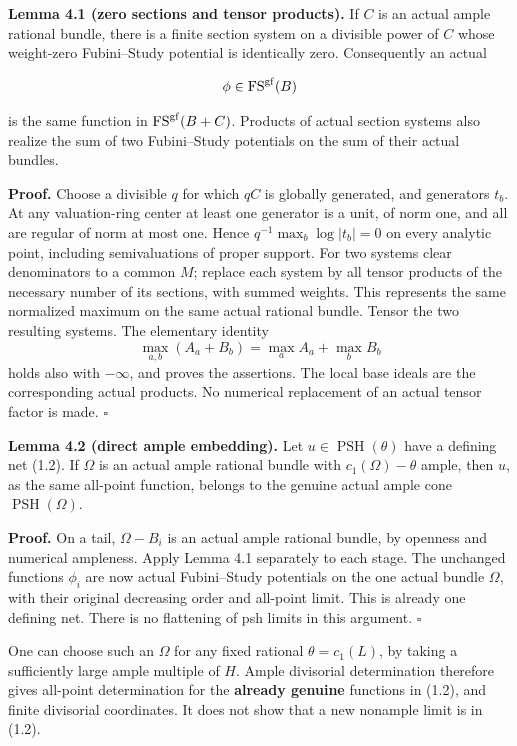 \documentclass[10pt]{article}
\begin{document}
\textbf{Lemma 4.1 (zero sections and tensor products).} If \(C\) is an
actual ample rational bundle, there is a finite section system on a
divisible power of \(C\) whose weight-zero Fubini--Study potential is
identically zero. Consequently an actual

\[
 \phi\in\operatorname{FS}^{\rm gf}(B)
\]

is the same function in \(\operatorname{FS}^{\rm gf}(B+C)\). Products of
actual section systems also realize the sum of two Fubini--Study
potentials on the sum of their actual bundles.

\textbf{Proof.} Choose a divisible \(q\) for which \(qC\) is globally
generated, and generators \(t_b\). At any valuation-ring center at least
one generator is a unit, of norm one, and all are regular of norm at
most one. Hence \(q^{-1}\max_b\log|t_b|=0\) on every analytic point,
including semivaluations of proper support. For two systems clear
denominators to a common \(M\); replace each system by all tensor
products of the necessary number of its sections, with summed weights.
This represents the same normalized maximum on the same actual rational
bundle. Tensor the two resulting systems. The elementary identity \[
 \max_{a,b}(A_a+B_b)=\max_a A_a+\max_b B_b
\] holds also with \(-\infty\), and proves the assertions. The local
base ideals are the corresponding actual products. No numerical
replacement of an actual tensor factor is made. \(\square\)

\textbf{Lemma 4.2 (direct ample embedding).} Let
\(u\in\operatorname{PSH}(\theta)\) have a defining net (1.2). If
\(\Omega\) is an actual ample rational bundle with
\(c_1(\Omega)-\theta\) ample, then \(u\), as the same all-point
function, belongs to the genuine actual ample cone
\(\operatorname{PSH}(\Omega)\).

\textbf{Proof.} On a tail, \(\Omega-B_i\) is an actual ample rational
bundle, by openness and numerical ampleness. Apply Lemma 4.1 separately
to each stage. The unchanged functions \(\phi_i\) are now actual
Fubini--Study potentials on the one actual bundle \(\Omega\), with their
original decreasing order and all-point limit. This is already one
defining net. There is no flattening of psh limits in this argument.
\(\square\)

One can choose such an \(\Omega\) for any fixed rational
\(\theta=c_1(L)\), by taking a sufficiently large ample multiple of
\(H\). Ample divisorial determination therefore gives all-point
determination for the \textbf{already genuine} functions in (1.2), and
finite divisorial coordinates. It does not show that a new nonample
limit is in (1.2).
\end{document}
